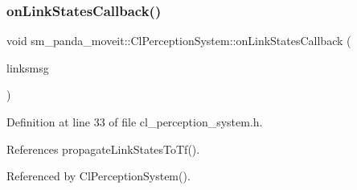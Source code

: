 \subsubsection{\texorpdfstring{on\+Link\+States\+Callback()}{onLinkStatesCallback()}}
{\footnotesize\ttfamily void sm\+\_\+panda\+\_\+moveit\+::\+Cl\+Perception\+System\+::on\+Link\+States\+Callback (\begin{DoxyParamCaption}\item[{const gazebo\+\_\+msgs\+::\+Link\+States \&}]{linksmsg }\end{DoxyParamCaption})\hspace{0.3cm}{\ttfamily [inline]}}



Definition at line 33 of file cl\+\_\+perception\+\_\+system.\+h.



References propagate\+Link\+States\+To\+Tf().



Referenced by Cl\+Perception\+System().


